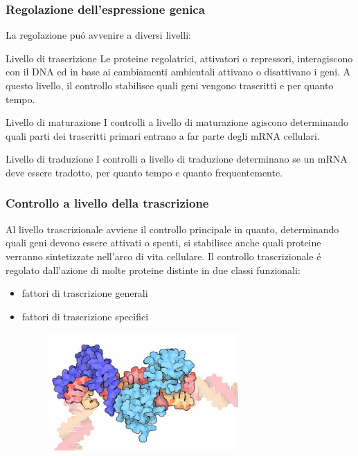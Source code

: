 \documentclass[hyperref={pdfpagelabels=false}]{beamer}
\begin{document}
\begin{frame}\frametitle{Regolazione dell'espressione genica}
La regolazione pu\'o avvenire a diversi livelli:
\begin{block}{Livello di trascrizione}
Le proteine regolatrici, attivatori o repressori, interagiscono con il DNA ed in base ai cambiamenti ambientali attivano o disattivano i geni. A questo livello, il controllo stabilisce quali geni vengono trascritti e per quanto tempo.
\end{block}
\begin{block}{Livello di maturazione}
I controlli a livello di maturazione agiscono determinando quali parti dei trascritti primari entrano a far parte degli mRNA cellulari.
\end{block}
\begin{block}{Livello di traduzione}
I controlli a livello di traduzione determinano se un mRNA deve essere tradotto, per quanto tempo e quanto frequentemente.
\end{block}
\end{frame}


\begin{frame} \frametitle{Controllo a livello della trascrizione}
Al livello trascrizionale avviene il controllo principale in quanto, determinando quali geni devono essere attivati o
spenti, si stabilisce anche quali proteine verranno sintetizzate nell'arco di vita cellulare.
Il controllo trascrizionale \'e regolato dall'azione di molte
proteine distinte in due classi funzionali:\\
\begin{itemize}
\item fattori di trascrizione generali
\item fattori di trascrizione specifici
\end{itemize}
\includegraphics[width=10.5cm,height=4.5cm,scale=0.5]{fattori.jpg}
\end{frame}
\end{document}
